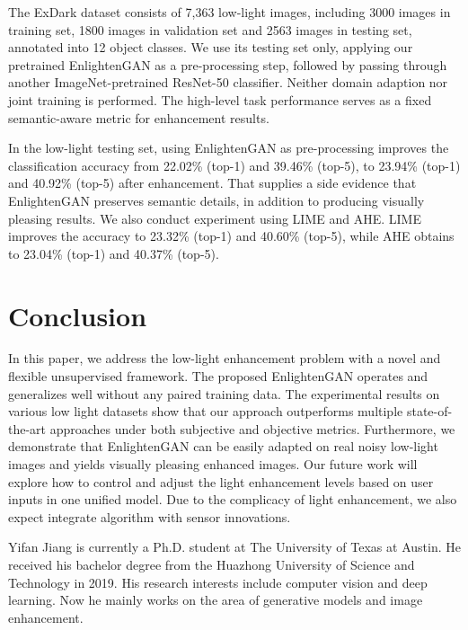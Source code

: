 \documentclass[journal]{IEEEtran}
\begin{document}
The ExDark dataset consists of 7,363 low-light images, including 3000 images in training set, 1800 images in validation set and 2563 images in testing set, annotated into 12 object classes. We use its testing set only, applying our pretrained EnlightenGAN as a pre-processing step, followed by passing through another ImageNet-pretrained ResNet-50 classifier. Neither domain adaption nor joint training is performed. The high-level task performance serves as a fixed semantic-aware metric for enhancement results.

In the low-light testing set, using EnlightenGAN as pre-processing improves the classification accuracy from 22.02\% (top-1) and 39.46\% (top-5), to 23.94\% (top-1) and 40.92\% (top-5) after enhancement. That supplies a side evidence that EnlightenGAN preserves semantic details, in addition to producing visually pleasing results. We also conduct experiment using LIME and AHE. LIME improves the accuracy to 23.32\% (top-1) and 40.60\% (top-5), while AHE obtains to 23.04\% (top-1) and 40.37\% (top-5). 




\section{Conclusion}
\vspace{-0.5em}
In this paper, we address the low-light enhancement problem with a novel and flexible unsupervised framework. The proposed EnlightenGAN operates and generalizes well without any paired training data. 
The experimental results on various low light datasets show that our approach outperforms multiple state-of-the-art approaches under both subjective and objective metrics. Furthermore, we demonstrate that EnlightenGAN can be easily adapted on real noisy low-light images and yields visually pleasing enhanced images. Our future work will explore how to control and adjust the light enhancement levels based on user inputs in one unified model. Due to the complicacy of light enhancement, we also expect integrate algorithm with sensor innovations.

{\small


}

\begin{IEEEbiography}
{Yifan Jiang}
is currently a Ph.D. student at The University of Texas at Austin. He received his bachelor degree from the Huazhong University of Science and Technology in 2019. His research interests include computer vision and deep learning. Now he mainly works on the area of generative models and image enhancement.
\end{IEEEbiography}
\end{document}
